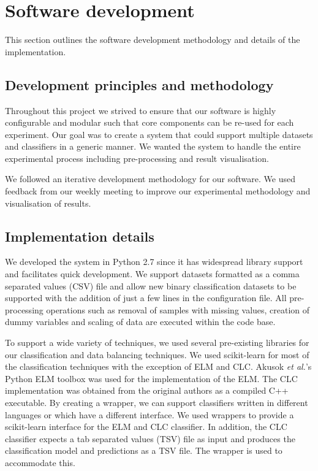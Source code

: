 \documentclass{sig-alternate-05-2015}
\begin{document}
	\section{Software development}
	This section outlines the software development methodology and details of the implementation.
	\subsection{Development principles and methodology}
	Throughout this project we strived to ensure that our software is highly configurable and modular such that core components can be re-used for each experiment. Our goal was to create a system that could support multiple datasets and classifiers in a generic manner. We wanted the system to handle the entire experimental process including pre-processing and result visualisation.
	
	We followed an iterative development methodology for our software. We used feedback from our weekly meeting to improve our experimental methodology and visualisation of results.
	
	\subsection{Implementation details}
	We developed the system in Python 2.7 since it has widespread library support and facilitates quick development. We support datasets formatted as a comma separated values (CSV) file and allow new binary classification datasets to be supported with the addition of just a few lines in the configuration file. All pre-processing operations such as removal of samples with missing values, creation of dummy variables and scaling of data are executed within the code base.
	
	To support a wide variety of techniques, we used several pre-existing libraries for our classification and data balancing techniques. We used scikit-learn \cite{scikit-learn} for most of the classification techniques with the exception of ELM and CLC. Akusok \textit{et al.}'s \cite{7140733} Python ELM toolbox was used for the implementation of the ELM. The CLC implementation was obtained from the original authors \cite{Chen2006} as a compiled C++ executable. By creating a wrapper, we can support classifiers written in different languages or which have a different interface. We used wrappers to provide a scikit-learn interface for the ELM and CLC classifier. In addition, the CLC classifier expects a tab separated values (TSV) file as input and produces the classification model and predictions as a TSV file. The wrapper is used to accommodate this.
	
\end{document}
